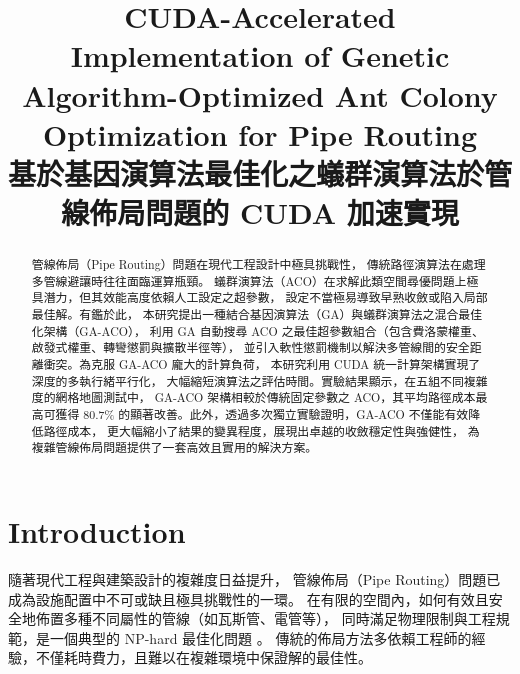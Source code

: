 \documentclass[conference]{IEEEtran}
\begin{document}
\title{CUDA-Accelerated Implementation of Genetic Algorithm-Optimized Ant Colony Optimization for Pipe Routing \\
{\footnotesize 基於基因演算法最佳化之蟻群演算法於管線佈局問題的 CUDA 加速實現}
}

\author{
\and
{}
}

\maketitle

\begin{abstract}
管線佈局（Pipe Routing）問題在現代工程設計中極具挑戰性，
傳統路徑演算法在處理多管線避讓時往往面臨運算瓶頸。
蟻群演算法（ACO）在求解此類空間尋優問題上極具潛力，但其效能高度依賴人工設定之超參數，
設定不當極易導致早熟收斂或陷入局部最佳解。有鑑於此，
本研究提出一種結合基因演算法（GA）與蟻群演算法之混合最佳化架構（GA-ACO），
利用 GA 自動搜尋 ACO 之最佳超參數組合（包含費洛蒙權重、啟發式權重、轉彎懲罰與擴散半徑等），
並引入軟性懲罰機制以解決多管線間的安全距離衝突。為克服 GA-ACO 龐大的計算負荷，
本研究利用 CUDA 統一計算架構實現了深度的多執行緒平行化，
大幅縮短演算法之評估時間。實驗結果顯示，在五組不同複雜度的網格地圖測試中，
GA-ACO 架構相較於傳統固定參數之 ACO，其平均路徑成本最高可獲得 80.7\%
 的顯著改善。此外，透過多次獨立實驗證明，GA-ACO 不僅能有效降低路徑成本，
 更大幅縮小了結果的變異程度，展現出卓越的收斂穩定性與強健性，
 為複雜管線佈局問題提供了一套高效且實用的解決方案。

\end{abstract}
\section{Introduction}
隨著現代工程與建築設計的複雜度日益提升，
管線佈局（Pipe Routing）問題已成為設施配置中不可或缺且極具挑戰性的一環。
在有限的空間內，如何有效且安全地佈置多種不同屬性的管線（如瓦斯管、電管等），
同時滿足物理限制與工程規範，是一個典型的 NP-hard 最佳化問題 \cite{b1}。
傳統的佈局方法多依賴工程師的經驗，不僅耗時費力，且難以在複雜環境中保證解的最佳性。\\
\end{document}
